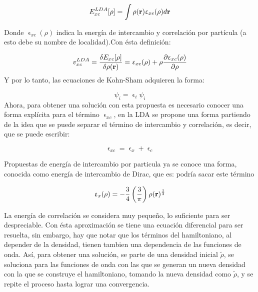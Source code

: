 \documentclass [11pt]{article}
\begin{document}
\begin{equation}
	E_{xc}^{LDA}[\rho]=\int \rho({\bf r})\upvarepsilon_{xc}(\rho)d{\bf r}
\end{equation}

Donde $\upvarepsilon_{xc}(\rho)$ indica la energía de intercambio y correlación por partícula (a esto debe su nombre de localidad).Con ésta definición:

\begin{equation}
    v_{xc}^{LDA}=\frac{\delta E_{xc}[\rho]}{\delta \rho({\bf r})}=\upvarepsilon_{xc}(\rho)+\rho\frac{\partial \upvarepsilon_{xc}(\rho)}{\partial \rho}
\end{equation}
Y por lo tanto, las ecuaciones de Kohn-Sham adquieren la forma:

\begin{equation}
    [-\frac{1}{2}\nabla^2+v({\bf r})+\int \frac{\rho({\bf r'})}{|{\bf r}-{\bf r'}}d{\bf r'}+ v_{xc}^{LDA}]\psi_i=\upvarepsilon_i \psi_i
\end{equation}
Ahora, para obtener una solución con esta propuesta es necesario conocer una forma explícita para el término $\upvarepsilon_{xc}$, en la LDA se propone una forma partiendo de la idea que se puede separar el término de intercambio y correlación, es decir, que se puede escribir:

\begin{equation}
    \upvarepsilon_{xc}=\upvarepsilon_{x}+\upvarepsilon_{c}
\end{equation}

Propuestas de energía de intercambio por particula ya se conoce una forma, conocida como energía de intercambio de Dirac, que es:{\color{magenta} podría sacar este término}

\begin{equation}
    \upvarepsilon_{x}(\rho)=-\frac{3}{4}\left(\frac{3}{\pi}\right)\rho({\bf r})^\frac{1}{3}
\end{equation}

La energía de correlación se considera muy pequeño, lo suficiente para ser despreciable. Con ésta aproximación se tiene una ecuación diferencial para ser resuelta, sin embargo, hay que notar que los términos del hamiltoniano, al depender de la densidad, tienen tambien una dependencia de las funciones de onda. Así, para obtener una solución, se parte de una densidad inicial $\tilde\rho$, se soluciona para las funciones de onda con las que se generan un nueva densidad con la que se construye el hamiltoniano, tomando la nueva densidad como $\tilde\rho$, y se repite el proceso hasta lograr una convergencia.
\end{document}
